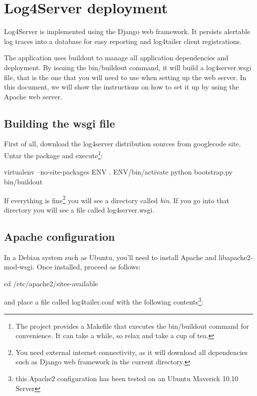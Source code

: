 \section{Log4Server deployment}
Log4Server is implemented using the Django web framework. It persists alertable
log traces into a database for easy reporting and log4tailer client
registrations. 

The application uses buildout to manage all application dependencies and
deployment. By issuing the bin/buildout command, it will build a
log4server.wsgi file, that is the one that you will need to use when setting up
the web server. In this document, we will show the instructions on how to set
it up by using the Apache web server. 

\subsection{Building the wsgi file}

First of all, download the log4server distribution sources from googlecode
site. Untar the package and execute\footnote{The project provides a Makefile
that executes the bin/buildout command for convenience. It can take a while, so 
relax and take a cup of tea.}:

\begin{cmd}
    virtualenv --no-site-packages ENV
    . ENV/bin/activate
    python bootstrap.py
    bin/buildout
\end{cmd}

If everything is fine\footnote{You need external internet connectivity, as it
will download all dependencies such as Django web framework in the current
directory.} you will see a directory called \emph{bin}. If you go
into that directory you will see a file called log4server.wsgi. 

\subsection{Apache configuration}
In a Debian system such as Ubuntu, you'll need to install Apache and
libapache2-mod-wsgi. Once installed, proceed as follows:

\begin{cmd}
    cd /etc/apache2/sites-available
\end{cmd}
and place a file called log4tailer.conf with the following
contents\footnote{this Apache2 configuration has been tested on an Ubuntu
Maverick 10.10 Server}:

